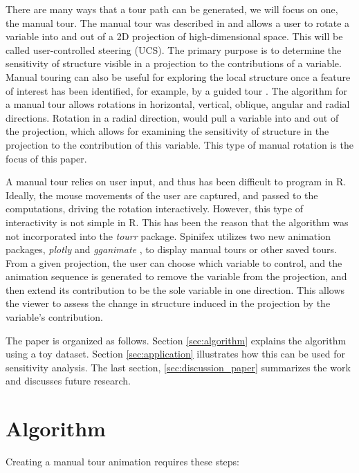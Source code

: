 \documentclass{monashthesis}
\begin{document}
There are many ways that a tour path can be generated, we will focus on
one, the manual tour. The manual tour was described in
\textcite{cook_manual_1997} and allows a user to rotate a variable into
and out of a 2D projection of high-dimensional space. This will be
called user-controlled steering (UCS). The primary purpose is to
determine the sensitivity of structure visible in a projection to the
contributions of a variable. Manual touring can also be useful for
exploring the local structure once a feature of interest has been
identified, for example, by a guided tour \autocite{cook_grand_1995}.
The algorithm for a manual tour allows rotations in horizontal,
vertical, oblique, angular and radial directions. Rotation in a radial
direction, would pull a variable into and out of the projection, which
allows for examining the sensitivity of structure in the projection to
the contribution of this variable. This type of manual rotation is the
focus of this paper.

A manual tour relies on user input, and thus has been difficult to
program in R. Ideally, the mouse movements of the user are captured, and
passed to the computations, driving the rotation interactively. However,
this type of interactivity is not simple in R. This has been the reason
that the algorithm was not incorporated into the \emph{tourr} package.
Spinifex utilizes two new animation packages, \emph{plotly}
\autocite{sievert_plotly_2018} and \emph{gganimate}
\autocite{pedersen_gganimate:_2019}, to display manual tours or other
saved tours. From a given projection, the user can choose which variable
to control, and the animation sequence is generated to remove the
variable from the projection, and then extend its contribution to be the
sole variable in one direction. This allows the viewer to assess the
change in structure induced in the projection by the variable's
contribution.

The paper is organized as follows. Section \ref{sec:algorithm} explains
the algorithm using a toy dataset. Section \ref{sec:application}
illustrates how this can be used for sensitivity analysis. The last
section, \ref{sec:discussion_paper} summarizes the work and discusses
future research.

\section{Algorithm}\label{sec:algorithm_paper}

Creating a manual tour animation requires these steps:
\end{document}
